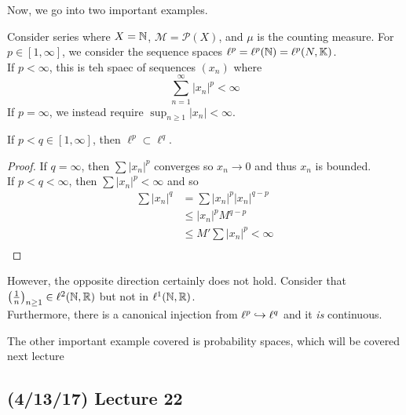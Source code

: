 \documentclass[11pt,leqno,oneside]{amsbook}
\numberwithin{thm}{section}
\renewcommand{\P}{\mathcal{P}}
\newcommand{\M}{\mathcal{M}}
\newcommand{\K}{\mathbb{K}} %
\begin{document}
Now, we go into two important examples.
\begin{example}
  Consider series where \(X = {\mathbb N}\), \(\M = \P(X)\), and \(\mu\) is the
  counting measure. For \(p \in [1,\infty]\), we consider the sequence
  spaces \(\ell^p = \ell^p(\N) = \ell^p(N,\K)\). \\
  If \(p < \infty\), this is teh spaec of sequences \((x_n)\) where \[
    \sum_{n=1}^\infty |x_n|^p < \infty
  \]
  If \(p = \infty\), we instead require \(\sup_{n \geq 1} |x_n| <
  \infty\). 
\end{example}
\begin{thm}
  If \(p < q \in [1,\infty]\), then \(\ell^p \subset \ell^q\). 
\end{thm}
\begin{proof}
  If \(q = \infty\), then \(\sum |x_n|^p\) converges so \(x_n \to 0\)
  and thus \(x_n\) is bounded.\\

  If \(p < q < \infty\), then \(\sum |x_n|^p < \infty\) and so
  \begin{align*}
    \sum |x_n|^q & = \sum |x_n|^p |x_n|^{q-p} \\
                 & \leq |x_n|^p M^{q-p} \\
                 & \leq M' \sum |x_n|^p < \infty \\
  \end{align*}
\end{proof}
  However, the opposite direction certainly does not hold. Consider
  that \(\left( \frac{1}{n} \right)_{n \geq 1} \in \ell^2({\mathbb N},{\mathbb R})\) but
  not in \(\ell^1({\mathbb N},{\mathbb R})\). \\

  Furthermore, there is a canonical injection from \(\ell^p \hookrightarrow
  \ell^q\) and it \emph{is} continuous.
  \begin{example}
    The other important example covered is probability spaces, which
    will be covered next lecture
  \end{example}
  \subsection*{(4/13/17) Lecture 22}
\end{document}
